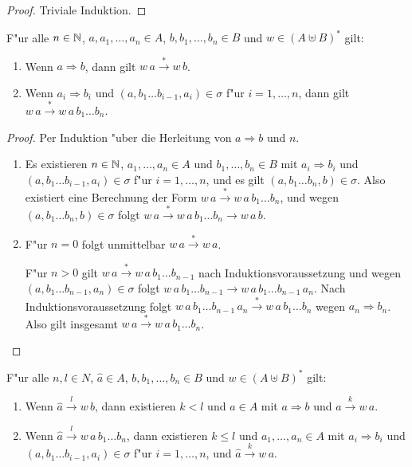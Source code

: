 \documentclass[12pt,a4paper]{article}
\begin{document}
\begin{proof}
  Triviale Induktion.
\end{proof}

\begin{theorem} \label{theorem:Vollstaendigkeit}
  F"ur alle $n \in \mathbb N$, $a,a_1,\ldots,a_n \in A$, $b,b_1,\ldots,b_n \in B$ und $w \in (A \uplus B)^*$ gilt:
  \begin{enumerate}
  \item Wenn $a \Rightarrow b$, dann gilt $w\,a \stackrel{*}{\to} w\,b$.
  \item Wenn $a_i \Rightarrow b_i$ und $(a,b_1 \ldots b_{i-1},a_i) \in \sigma$ f"ur $i=1,\ldots,n$, dann gilt
    $w\,a \stackrel{*}{\to} w\,a\,b_1 \ldots b_n$.
  \end{enumerate}
\end{theorem}

\begin{proof}
  Per Induktion "uber die Herleitung von $a \Rightarrow b$ und $n$.
  \begin{enumerate}
  \item Es existieren $n \in \mathbb N$, $a_1,\ldots,a_n \in A$ und $b_1,\ldots,b_n \in B$ mit
    $a_i \Rightarrow b_i$ und $(a,b_1 \ldots b_{i-1},a_i) \in \sigma$ f"ur $i = 1,\ldots,n$,
    und es gilt $(a,b_1 \ldots b_n,b) \in \sigma$. Also existiert eine Berechnung der Form
    $w\,a \stackrel{*}{\to} w\,a\,b_1 \ldots b_n$, und wegen $(a,b_1 \ldots b_n,b) \in \sigma$
    folgt $w\,a \stackrel{*}{\to} w\,a\,b_1 \ldots b_n \to w\,a\,b$.

  \item F"ur $n = 0$ folgt unmittelbar $w\,a \stackrel{*}{\to} w\,a$.

    F"ur $n > 0$ gilt $w\,a \stackrel{*}{\to} w\,a\,b_1 \ldots b_{n-1}$ nach Induktionsvoraussetzung und wegen
    $(a,b_1 \ldots b_{n-1},a_n)\in\sigma$ folgt $w\,a\,b_1 \ldots b_{n-1} \to w\,a\,b_1 \ldots b_{n-1}\,a_n$.
    Nach Induktionsvoraussetzung folgt
    $w\,a\,b_1 \ldots b_{n-1}\,a_n \stackrel{*}{\to} w\,a\,b_1 \ldots b_n$ wegen $a_n \Rightarrow b_n$.
    Also gilt insgesamt $w\,a \stackrel{*}{\to} w\,a\,b_1 \ldots b_n$.
  \end{enumerate}
\end{proof}

\begin{theorem}[Korrektheit] \label{theorem:Korrektheit}
  F"ur alle $n,l \in N$, $\hat{a} \in A$, $b, b_1,\ldots,b_n \in B$ und
  $w \in (A \uplus B)^*$ gilt:
  \begin{enumerate}
  \item Wenn $\hat{a} \stackrel{l}{\to} w\,b$, dann existieren $k < l$ und $a \in A$ mit
    $a \Rightarrow b$ und $\hat{a} \stackrel{k}{\to} w\,a$.
  \item Wenn $\hat{a} \stackrel{l}{\to} w\,a\,b_1 \ldots b_n$, dann existieren $k \le l$
    und $a_1,\ldots,a_n \in A$ mit
    $a_i \Rightarrow b_i$ und $(a,b_1 \ldots b_{i-1},a_i) \in \sigma$ f"ur $i=1,\ldots,n$, und
    $\hat{a} \stackrel{k}{\to} w\,a$.
  \end{enumerate}
\end{theorem}
\end{document}
